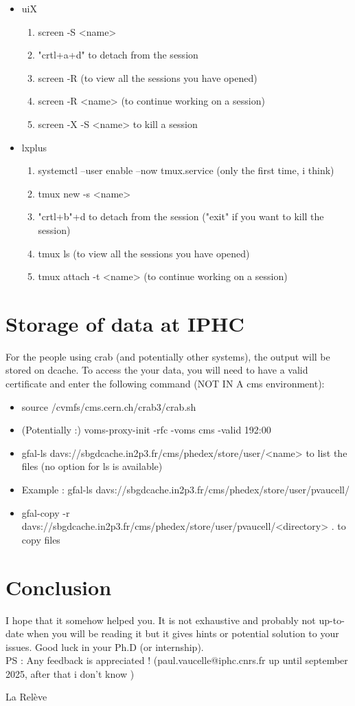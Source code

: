\documentclass[reprint, a4paper, nofootinbib, amsmath, amssymb, aps]{revtex4-1}
\begin{document}
\begin{itemize}
    \item uiX \begin{enumerate}
        \item screen -S <name>
        \item  "crtl+a+d" to detach from the session
        \item screen -R (to view all the sessions you have opened)
        \item screen -R <name> (to continue working on a session)
        \item screen -X -S <name> to kill a session
    \end{enumerate}
    \item lxplus \begin{enumerate}
        \item systemctl --user enable --now tmux.service (only the first time, i think)
        \item tmux new -s <name>
        \item "crtl+b"+d to detach from the session ("exit" if you want to kill the session)
        \item tmux ls (to view all the sessions you have opened)
        \item tmux attach -t <name> (to continue working on a session)
    \end{enumerate}
\end{itemize}
\section{Storage of data at IPHC}
For the people using crab (and potentially other systems), the output will be stored on dcache. To access the your data, you will need to have a valid certificate and enter the following command (NOT IN A cms environment):\begin{itemize}
    \item source /cvmfs/cms.cern.ch/crab3/crab.sh 
    \item (Potentially :) voms-proxy-init -rfc -voms cms -valid 192:00
    \item gfal-ls davs://sbgdcache.in2p3.fr/cms/phedex/store/user/<name> to list the files (no option for ls is available)
    \item Example : gfal-ls davs://sbgdcache.in2p3.fr/cms/phedex/store/user/pvaucell/
    \item gfal-copy -r davs://sbgdcache.in2p3.fr/cms/phedex/store/user/pvaucell/<directory> . to copy files
\end{itemize}
\section{Conclusion}

I hope that it somehow helped you. It is not exhaustive and probably not up-to-date when you will be reading it but it gives hints or potential solution to your issues. Good luck in your Ph.D (or internship).\\
PS : Any feedback is appreciated ! (paul.vaucelle@iphc.cnrs.fr up until september 2025, after that i don't know )

La Relève 
\end{document}
